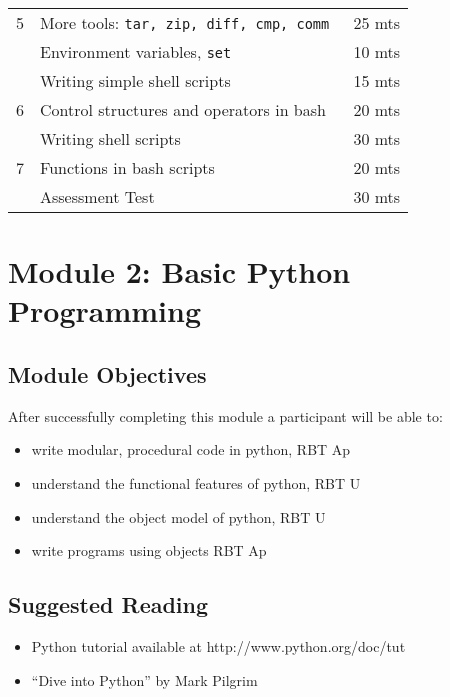 \documentclass{article}
\begin{document}
\begin{tabular}{llr}
5 & More tools: \tt{tar, zip, diff, cmp, comm}                       & 25 mts\\
  & Environment variables, \tt{set}                                  & 10 mts\\
  & Writing simple shell scripts                                     & 15 mts\\\hline

6 & Control structures and operators in bash                         & 20 mts\\
  & Writing shell scripts                                            & 30 mts\\\hline

7 & Functions in bash scripts                                        & 20 mts\\
  & Assessment Test                                                  & 30 mts\\\hline\hline
\end{tabular}

\section{Module 2: Basic Python Programming}
\label{BPyP}
\subsection{Module Objectives}
After successfully completing this module a participant will be able to:
	\begin{itemize}
            \item write modular, procedural code in python, \hfill RBT Ap
            \item understand the functional features of python, \hfill RBT U\phantom{p}
            \item understand the object model of python, \hfill RBT U\phantom{p}
            \item write programs using objects \hfill RBT Ap
	\end{itemize}
\subsection{Suggested Reading}
\begin{itemize}
    \item Python tutorial available at http://www.python.org/doc/tut
    \item ``Dive into Python'' by Mark Pilgrim
\end{itemize}
\end{document}
